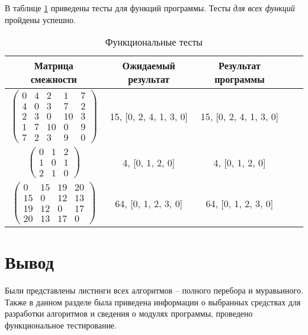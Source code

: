 В таблице \ref{tbl:functional_test} приведены тесты для функций программы. Тесты \textit{для всех функций} пройдены успешно.

\begin{center}
    \captionsetup{justification=raggedright,singlelinecheck=off}
    \begin{longtable}[c]{|c|c|c|c|c|}
    \caption{Функциональные тесты\label{tbl:functional_test}} \\ \hline
		Матрица смежности & Ожидаемый результат & Результат программы \\
		\hline
		$ \begin{pmatrix}
			0 &  4 &  2 &  1 & 7 \\
			4 &  0 &  3 &  7 & 2 \\
			2 &  3 &  0 & 10 & 3 \\
			1 &  7 & 10 &  0 & 9 \\
			7 &  2 &  3 &  9 & 0
		\end{pmatrix}$ &
		15, [0, 2, 4, 1, 3, 0] &
		15, [0, 2, 4, 1, 3, 0] \\

		$ \begin{pmatrix}
			0 & 1 & 2 \\
			1 & 0 & 1 \\
			2 & 1 & 0	
		\end{pmatrix}$ &
		4, [0, 1, 2, 0] &
		4, [0, 1, 2, 0] \\

		$ \begin{pmatrix}
			0 & 15 & 19 & 20 \\
			15 &  0 & 12 & 13 \\
			19 & 12 &  0 & 17 \\
			20 & 13 & 17 &  0
		\end{pmatrix}$ &
		64, [0, 1, 2, 3, 0] &
		64, [0, 1, 2, 3, 0] \\
		\hline
	\end{longtable}
\end{center}

\section{Вывод}

Были представлены листинги всех алгоритмов -- полного перебора и муравьиного. Также в данном разделе была приведена информации о выбранных средствах для разработки алгоритмов и сведения о модулях программы, проведено функциональное тестирование.
